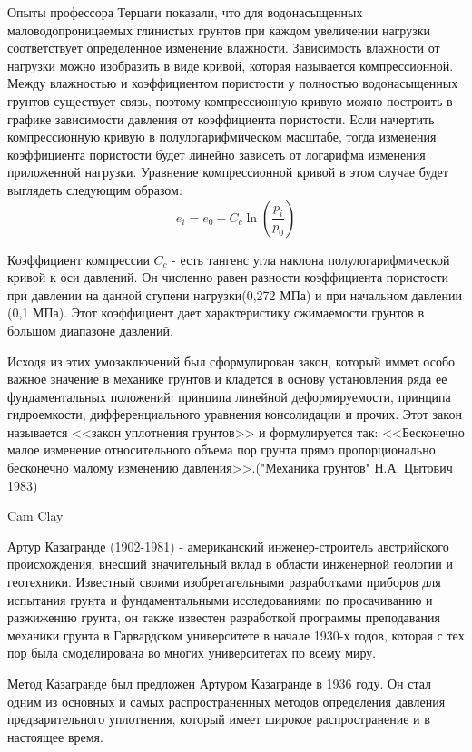  Опыты профессора Терцаги показали, что для водонасыщенных маловодопроницаемых глинистых грунтов при каждом увеличении нагрузки соответствует определенное изменение влажности. Зависимость влажности от нагрузки можно изобразить в виде кривой, которая называется компрессионной. Между влажностью и коэффициентом пористости у полностью водонасыщенных грунтов существует связь, поэтому компрессионную кривую можно построить в графике зависимости давления от коэффициента пористости. Если начертить компрессионную кривую в полулогарифмическом масштабе, тогда изменения коэффициента пористости будет линейно зависеть от логарифма изменения приложенной нагрузки. Уравнение компрессионной кривой в этом случае будет выглядеть следующим образом:
 $$e_i=e_0-C_c\ln(\frac{p_i}{p_0})$$
 
 
 Коэффициент компрессии $C_c$ - есть тангенс угла наклона полулогарифмической кривой к оси давлений. Он численно равен разности коэффициента пористости при давлении на данной ступени нагрузки(0,272 МПа) и при начальном давлении (0,1 МПа). Этот коэффициент дает характеристику сжимаемости грунтов в большом диапазоне давлений. 
 
 Исходя из этих умозаключений был сформулирован закон, который иммет особо важное значение в механике грунтов и кладется в основу установления ряда ее фундаментальных положений: принципа линейной деформируемости, принципа гидроемкости, дифференциального уравнения консолидации и прочих. Этот закон называется <<закон уплотнения грунтов>> и формулируется так: <<Бесконечно малое изменение относительного объема пор грунта прямо пропорционально бесконечно малому изменению давления>>.("Механика грунтов" Н.А. Цытович 1983)

 Cam Clay


 
 Артур Казагранде (1902-1981) - американский инженер-строитель австрийского происхождения, внесший значительный вклад в области инженерной геологии и геотехники. Известный своими изобретательными разработками приборов для испытания грунта и фундаментальными исследованиями по просачиванию и разжижению грунта, он также известен разработкой программы преподавания механики грунта в Гарвардском университете в начале 1930-х годов, которая с тех пор была смоделирована во многих университетах по всему миру. 
 
 Метод Казагранде был предложен Артуром Казагранде в 1936 году. Он стал одним из основных и самых распространенных методов определения давления предварительного уплотнения, который имеет широкое распространение и в настоящее время.

